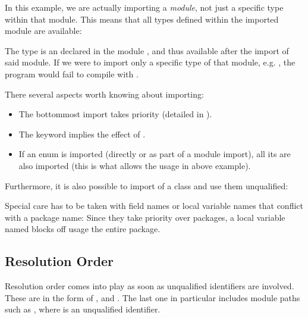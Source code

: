 \documentclass{haxe}
\begin{document}
In this example, we are actually importing a \emph{module}, not just a specific type within that module. This means that all types defined within the imported module are available:


The type  is an  declared in the module , and thus available after the import of said module. If we were to import only a specific type of that module, e.g. , the program would fail to compile with .

There several aspects worth knowing about importing:

\begin{itemize}
	\item The bottommost import takes priority (detailed in ).
	\item The  keyword  implies the effect of .
	\item If an enum is imported (directly or as part of a module import), all its  are also imported (this is what allows the  usage in above example).
\end{itemize}

Furthermore, it is also possible to import  of a class and use them unqualified:



Special care has to be taken with field names or local variable names that conflict with a package name: Since they take priority over packages, a local variable named  blocks off usage the entire  package.

\subsection{Resolution Order}
\label{type-system-resolution-order}

Resolution order comes into play as soon as unqualified identifiers are involved. These are  in the form of ,  and . The last one in particular includes module paths such as , where  is an unqualified identifier.  
\end{document}
